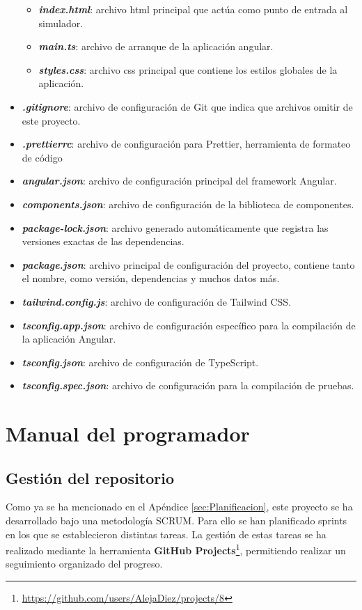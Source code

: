 \begin{itemize}
\begin{itemize}
        \item \textit{\textbf{index.html}}: archivo html principal que actúa como punto de entrada al simulador. 
        \item \textit{\textbf{main.ts}}: archivo de arranque de la aplicación angular.
        \item \textit{\textbf{styles.css}}: archivo css principal que contiene los estilos globales de la aplicación.
    \end{itemize}
    \item \textit{\textbf{.gitignore}}: archivo de configuración de Git que indica que archivos omitir de este proyecto.
    \item \textit{\textbf{.prettierrc}}: archivo de configuración para Prettier, herramienta de formateo de código
    \item \textit{\textbf{angular.json}}: archivo de configuración principal del framework Angular.
    \item \textit{\textbf{components.json}}: archivo de configuración de la biblioteca de componentes.
    \item \textit{\textbf{package-lock.json}}: archivo generado automáticamente que registra las versiones exactas de las dependencias.
    \item \textit{\textbf{package.json}}: archivo principal de configuración del proyecto, contiene tanto el nombre, como versión, dependencias y muchos datos más.
    \item \textit{\textbf{tailwind.config.js}}: archivo de configuración de Tailwind CSS.
    \item \textit{\textbf{tsconfig.app.json}}: archivo de configuración específico para la compilación de la aplicación Angular.
    \item \textit{\textbf{tsconfig.json}}: archivo de configuración de TypeScript.
    \item \textit{\textbf{tsconfig.spec.json}}: archivo de configuración para la compilación de pruebas.
\end{itemize}

\section{Manual del programador}
\label{sec:ManualProgramador}
\subsection{Gestión del repositorio}
\label{subsec:GestionRepositorio}
Como ya se ha mencionado en el Apéndice \ref{sec:Planificacion}, este proyecto se ha desarrollado bajo una metodología SCRUM. Para ello se han planificado sprints en los que se establecieron distintas tareas. La gestión de estas tareas se ha realizado mediante la herramienta \textbf{GitHub Projects}\footnote{\url{https://github.com/users/AlejaDiez/projects/8}}, permitiendo realizar un seguimiento organizado del progreso.

